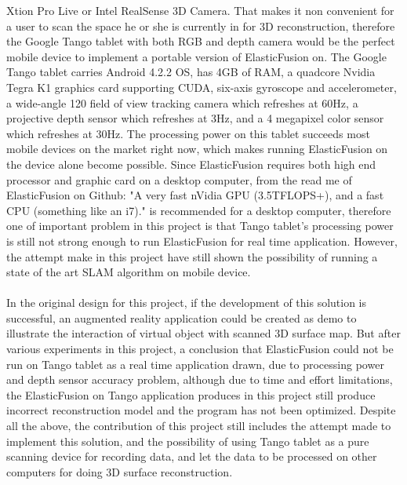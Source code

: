 \documentclass[12pt,twoside]{article}
\begin{document}
Xtion Pro Live or Intel RealSense 3D Camera. That makes it non convenient for a user to scan the space he or she is currently in for 3D reconstruction, therefore the Google Tango tablet with both RGB and depth camera would be the perfect mobile device to implement a portable version of ElasticFusion on. The Google Tango tablet carries Android 4.2.2 OS, has 4GB of RAM, a quadcore Nvidia Tegra K1 graphics card supporting CUDA, six-axis gyroscope and accelerometer, a wide-angle 120 field of view tracking camera which refreshes at 60Hz, a projective depth sensor which refreshes at 3Hz, and a 4 megapixel color sensor which refreshes at 30Hz. The processing power on this tablet succeeds most mobile devices on the market right now, which makes running ElasticFusion on the device alone become possible. Since ElasticFusion requires both high end processor and graphic card on a desktop computer, from the read me of ElasticFusion on Github: "A very fast nVidia GPU (3.5TFLOPS+), and a fast CPU (something like an i7)." is recommended for a desktop computer, therefore one of important problem in this project is that Tango tablet's processing power is still not strong enough to run ElasticFusion for real time application. However, the attempt make in this project have still shown the possibility of running a state of the art SLAM  algorithm on mobile device.\\
\\
In the original design for this project, if the development of this solution is successful, an augmented reality application could be created as demo to illustrate the interaction of virtual object with scanned 3D surface map. But after various experiments in this project, a conclusion that ElasticFusion could not be run on Tango tablet as a real time application drawn, due to processing power and depth sensor accuracy problem, although due to time and effort limitations, the ElasticFusion on Tango application produces in this project still produce incorrect reconstruction model and the program has not been optimized. Despite all the above, the contribution of this project still includes the attempt made to implement this solution, and the possibility of using Tango tablet as a pure scanning device for recording data, and let the data to be processed on other computers for doing 3D surface reconstruction.\\
\\
\end{document}
